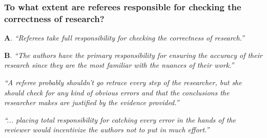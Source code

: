 \documentclass[12pt]{beamer}
\newcommand\ans[1]{{\it ``#1''}}
\newcommand\gap{\vspace{5mm}}
\begin{document}
\begin{frame}  %
  \frametitle{To what extent are referees responsible for checking the correctness of research?} 

{\bf A}.  \ans{Referees take full responsibility for checking the correctness of research.}

\gap

{\bf B}.    \ans{The authors have the primary responsibility for ensuring the accuracy of their research since  they  are  the  most  familiar  with  the  nuances  of  their  work.}

\end{frame}
\begin{frame}
  

  \ans{A referee probably shouldn’t go retrace every step of the researcher,  but she should check for any kind of obvious errors and that the conclusions the researcher makes are justified by the evidence provided.}

  \gap
  
\ans{... placing total responsibility for catching every error in the hands of the reviewer would incentivize the authors not to put in much effort.}

\end{frame}
\end{document}

